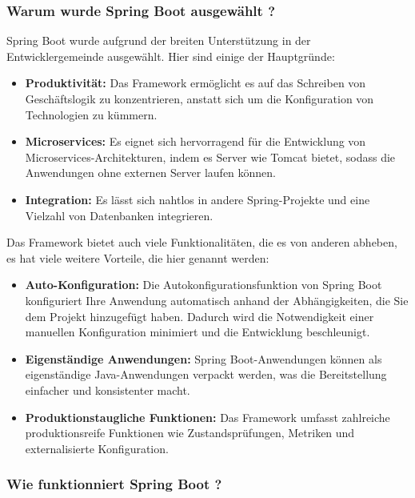 \subsubsection{Warum wurde Spring Boot ausgewählt ?}
Spring Boot wurde aufgrund der breiten Unterstützung in der Entwicklergemeinde ausgewählt. Hier sind einige der Hauptgründe:
\begin{itemize}
	\item \textbf{Produktivität:} Das Framework ermöglicht es auf das Schreiben von Geschäftslogik zu konzentrieren, anstatt sich um die Konfiguration von Technologien zu kümmern.
	\item \textbf{Microservices:} Es eignet sich hervorragend für die Entwicklung von Microservices-Architekturen, indem es Server wie Tomcat bietet, sodass die Anwendungen ohne externen Server laufen können.
	\item \textbf{Integration:} Es lässt sich nahtlos in andere Spring-Projekte und eine Vielzahl von Datenbanken integrieren.
\end{itemize}
Das Framework bietet auch viele Funktionalitäten, die es von anderen abheben, es hat viele weitere Vorteile, die hier genannt werden:

\begin{itemize}
	\item \textbf{Auto-Konfiguration:} Die Autokonfigurationsfunktion von Spring Boot konfiguriert Ihre Anwendung automatisch anhand der Abhängigkeiten, die Sie dem Projekt hinzugefügt haben. Dadurch wird die Notwendigkeit einer manuellen Konfiguration minimiert und die Entwicklung beschleunigt.
	\item \textbf{Eigenständige Anwendungen:} Spring Boot-Anwendungen können als eigenständige Java-Anwendungen verpackt werden, was die Bereitstellung einfacher und konsistenter macht.
	\item \textbf{Produktionstaugliche Funktionen:} Das Framework umfasst zahlreiche produktionsreife Funktionen wie Zustandsprüfungen, Metriken und externalisierte Konfiguration.	
\end{itemize}

\subsubsection{Wie funktionniert Spring Boot ?}

